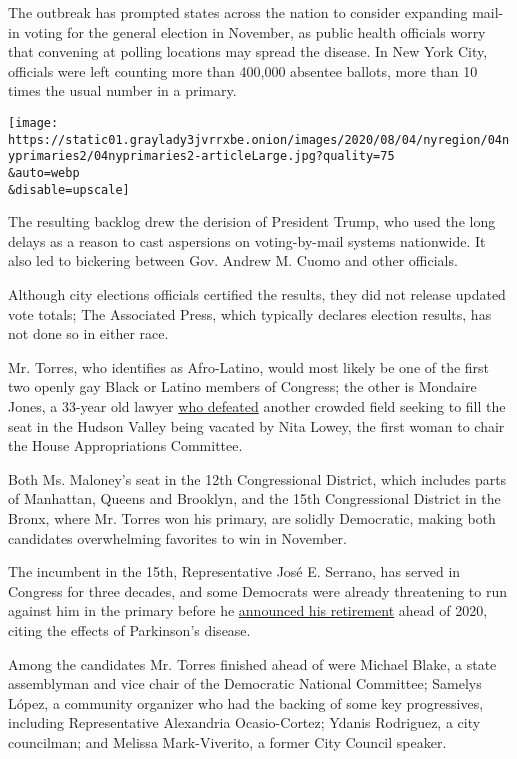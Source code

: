 The outbreak has prompted states across the nation to consider expanding
mail-in voting for the general election in November, as public health
officials worry that convening at polling locations may spread the
disease. In New York City, officials were left counting more than
400,000 absentee ballots, more than 10 times the usual number in a
primary.

\texttt{[image: https://static01.graylady3jvrrxbe.onion/images/2020/08/04/nyregion/04nyprimaries2/04nyprimaries2-articleLarge.jpg?quality=75\\\&auto=webp\\\&disable=upscale]}

The resulting backlog drew the derision of President Trump, who used the
long delays as a reason to cast aspersions on voting-by-mail systems
nationwide. It also led to bickering between Gov. Andrew M. Cuomo and
other officials.

Although city elections officials certified the results, they did not
release updated vote totals; The Associated Press, which typically
declares election results, has not done so in either race.

Mr. Torres, who identifies as Afro-Latino, would most likely be one of
the first two openly gay Black or Latino members of Congress; the other
is Mondaire Jones, a 33-year old lawyer
\href{https://www.nytimes3xbfgragh.onion/2020/07/14/nyregion/mondaire-jones-house-primary.html}{who
defeated} another crowded field seeking to fill the seat in the Hudson
Valley being vacated by Nita Lowey, the first woman to chair the House
Appropriations Committee.

Both Ms. Maloney's seat in the 12th Congressional District, which
includes parts of Manhattan, Queens and Brooklyn, and the 15th
Congressional District in the Bronx, where Mr. Torres won his primary,
are solidly Democratic, making both candidates overwhelming favorites to
win in November.

The incumbent in the 15th, Representative José E. Serrano, has served in
Congress for three decades, and some Democrats were already threatening
to run against him in the primary before he
\href{https://www.nytimes3xbfgragh.onion/2019/03/25/nyregion/jose-serrano-parkinsons-retire.html}{announced
his retirement} ahead of 2020, citing the effects of Parkinson's
disease.

Among the candidates Mr. Torres finished ahead of were Michael Blake, a
state assemblyman and vice chair of the Democratic National Committee;
Samelys López, a community organizer who had the backing of some key
progressives, including Representative Alexandria Ocasio-Cortez; Ydanis
Rodriguez, a city councilman; and Melissa Mark-Viverito, a former City
Council speaker.

